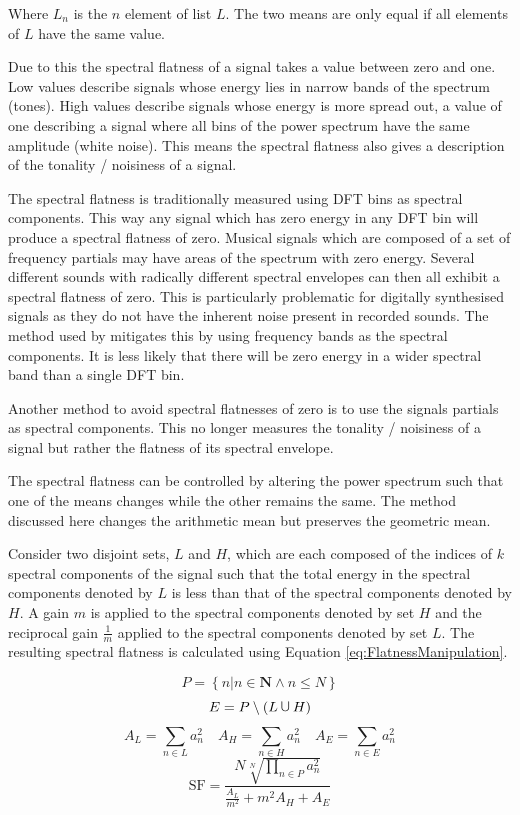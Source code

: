 		Where $L_{n}$ is the $n$ element of list $L$. The two means are only equal if all elements of $L$
		have the same value.

		Due to this the spectral flatness of a signal takes a value between zero and one. Low values describe
		signals whose energy lies in narrow bands of the spectrum (tones). High values describe signals whose
		energy is more spread out, a value of one describing a signal where all bins of the power spectrum have the
		same amplitude (white noise). This means the spectral flatness also gives a description of the tonality /
		noisiness of a signal.

		The spectral flatness is traditionally measured using DFT bins as spectral components. This way any signal
		which has zero energy in any DFT bin will produce a spectral flatness of zero. Musical signals which are
		composed of a set of frequency partials may have areas of the spectrum with zero energy. Several different
		sounds with radically different spectral envelopes can then all exhibit a spectral flatness of zero. This
		is particularly problematic for digitally synthesised signals as they do not have the inherent noise
		present in recorded sounds. The method used by \citet{peeters2004a} mitigates this by using frequency bands
		as the spectral components. It is less likely that there will be zero energy in a wider spectral band than
		a single DFT bin. 
		
		Another method to avoid spectral flatnesses of zero is to use the signals partials as spectral components.
		This no longer measures the tonality / noisiness of a signal but rather the flatness of its spectral
		envelope.

		The spectral flatness can be controlled by altering the power spectrum such that one of the means changes
		while the other remains the same. The method discussed here changes the arithmetic mean but preserves the
		geometric mean. 

		Consider two disjoint sets, $L$ and $H$, which are each composed of the indices of $k$ spectral components
		of the signal such that the total energy in the spectral components denoted by $L$ is less than that of the
		spectral components denoted by $H$. A gain $m$ is applied to the spectral components denoted by set $H$ and
		the reciprocal gain $\frac{1}{m}$ applied to the spectral components denoted by set $L$. The resulting
		spectral flatness is calculated using Equation \ref{eq:FlatnessManipulation}.

		\[ P = \left\{ n | n \in \textbf{N} \land n \leq N \right\} \]
		\[ E = P \setminus (L \medcup H) \]
		\[ A_{L} = \sum_{n \in L} a_{n}^{2} \quad A_{H} = \sum_{n \in H} a_{n}^{2}
		   \quad A_{E} = \sum_{n \in E} a_{n}^{2} \]
		\begin{equation}
			\textrm{SF} = \frac{N\sqrt[N]{\prod_{n \in P} a_{n}^{2}}}
			                   {\frac{A_{L}}{m^{2}} + m^{2}A_{H} + A_{E}}
		  	\label{eq:FlatnessManipulation}
		\end{equation}

